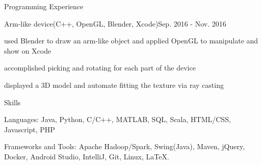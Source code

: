 \documentclass{resume} %
\begin{document}
\begin{rSection}{Programming Experience}
\begin{rSubsection}{Arm-like device(C++, OpenGL, Blender, Xcode)}{Sep. 2016 - Nov. 2016}{}{}
\item used Blender to draw an arm-like object and applied OpenGL to manipulate and show on Xcode
\item accomplished picking and rotating for each part of the device 
\item displayed a 3D model and automate fitting the texture via ray casting
\end{rSubsection}







\end{rSection}

\begin{pSection}{Skills}
\item Languages: Java, Python, C/C++, MATLAB, SQL, Scala, HTML/CSS, Javascript, PHP
\item Frameworks and Tools: Apache Hadoop/Spark, Swing(Java), Maven, jQuery, Docker, Android Studio, IntelliJ, Git, Linux, LaTeX.
\end{pSection}




\end{document}
